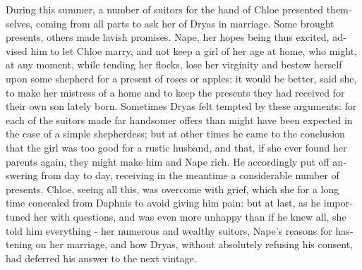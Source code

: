 \documentclass{book}
\begin{document}
\begin{pairs}
\begin{Rightside}
\begin{english}
  During this summer, a number of suitors for the hand of Chloe presented themselves, coming from all parts to ask her of Dryas in marriage.  Some brought presents, others made lavish promises.  Nape, her hopes being thus excited, advised him to let Chloe marry, and not keep a girl of her age at home, who might, at any moment, while tending her flocks, lose her virginity and bestow herself upon some shepherd for a present of roses or apples: it would be better, said she, to make her mistress of a home and to keep the presents they had received for their own son lately born.  Sometimes Dryas felt tempted by these arguments: for each of the suitors made far handsomer offers than might have been expected in the case of a simple shepherdess; but at other times he came to the conclusion that the girl was too good for a rustic husband, and that, if she ever found her parents again, they might make him and Nape rich.  He accordingly put off answering from day to day, receiving in the meantime a considerable number of presents.  Chloe, seeing all this, was overcome with grief, which she for a long time concealed from Daphnis to avoid giving him pain: but at last, as he importuned her with questions, and was even more unhappy than if he knew all, she told him everything - her numerous and wealthy suitors, Nape's reasons for hastening on her marriage, and how Dryas, without absolutely refusing his consent, had deferred his answer to the next vintage.
\pend



\end{english}
\end{Rightside}
\end{pairs}
\end{document}
